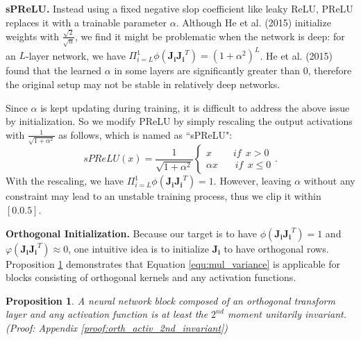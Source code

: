 \documentclass[10pt,journal,compsoc]{IEEEtran}
\newcommand{\modify}[1]{{ #1}}
\newtheorem{prop}{Proposition}[section]
\begin{document}
\textbf{sPReLU. } Instead using a fixed negative slop coefficient like leaky ReLU, PReLU \cite{he2015delving} replaces it with a trainable parameter $\alpha$. Although He et al. (2015) \cite{he2015delving} initialize weights with $\frac{\sqrt{2}}{\sqrt{n}}$, we find it might be problematic when the network is deep: for an $L$-layer network, we have $\Pi_{i=L}^1\phi(\mathbf{J_iJ_i}^T)=(1+\alpha^2)^L$. He et al. (2015) \cite{he2015delving} found that the learned $\alpha$ in some layers are significantly greater than 0, therefore the original setup may not be stable in relatively deep networks.

\begin{comment}
\begin{figure}[ht]
\centering
\texttt{[image: figure/prelu\_explode.pdf]}
\caption{$||\mathbf{\Delta\theta}||_2^2/\eta^2$ in a 32-layer network with PReLU whose $\alpha$ is fixed to 0.35. The result is averaged over 100 iterations.}
\label{fig:prelu_explode}
\end{figure}
\end{comment}


Since $\alpha$ is kept updating during training, it is difficult to address the above issue by initialization. So we modify PReLU by simply rescaling the output activations with $\frac{1}{\sqrt{1+\alpha^2}}$ as follows, which is named as ``sPReLU":
\begin{equation}
        sPReLU(x) = \frac{1}{\sqrt{1+\alpha^2}}\left\{
             \begin{array}{lr}
             x~~~~~~~~~~if~~x>0  \\
             \alpha x~~~~~~~~if~~x \le0
             \end{array}
\right..
\end{equation}
With the rescaling, we have $\Pi_{i=L}^1\phi(\mathbf{J_iJ_i}^T)=1$. However, leaving $\alpha$ without any constraint may lead to an unstable training process, thus we clip it within $[0. 0.5]$.

\textbf{Orthogonal Initialization.}
\modify{Because our target is to have $\phi(\mathbf{J_iJ_i}^T)=1$ and $\varphi(\mathbf{J_iJ_i}^T)\approx 0$, one intuitive idea is to initialize $\mathbf{J_i}$ to have orthogonal rows. }Proposition \ref{prop:orth_activ_2nd_invariant} demonstrates that Equation \eqref{equ:mul_variance} is applicable for blocks consisting of orthogonal kernels and any activation functions.

\begin{prop}
A neural network block composed of an orthogonal transform layer and any activation function is at least the $2^{nd}$ moment unitarily invariant. (Proof: Appendix \ref{proof:orth_activ_2nd_invariant})
\label{prop:orth_activ_2nd_invariant}
\end{prop}
\end{document}
